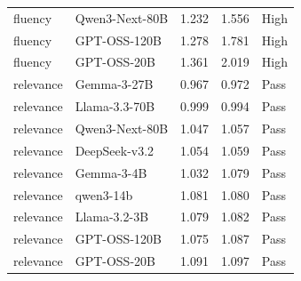 \begin{table}[t]
{\begin{tabular}{llrrl}
fluency & Qwen3-Next-80B & 1.232 & 1.556 & High \\
fluency & GPT-OSS-120B & 1.278 & 1.781 & High \\
fluency & GPT-OSS-20B & 1.361 & 2.019 & High \\
relevance & Gemma-3-27B & 0.967 & 0.972 & Pass \\
relevance & Llama-3.3-70B & 0.999 & 0.994 & Pass \\
relevance & Qwen3-Next-80B & 1.047 & 1.057 & Pass \\
relevance & DeepSeek-v3.2 & 1.054 & 1.059 & Pass \\
relevance & Gemma-3-4B & 1.032 & 1.079 & Pass \\
relevance & qwen3-14b & 1.081 & 1.080 & Pass \\
relevance & Llama-3.2-3B & 1.079 & 1.082 & Pass \\
relevance & GPT-OSS-120B & 1.075 & 1.087 & Pass \\
relevance & GPT-OSS-20B & 1.091 & 1.097 & Pass \\
\bottomrule
\end{tabular}
}
\end{table}